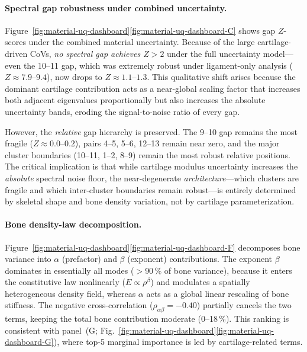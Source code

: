 \documentclass[11pt]{article}
\begin{document}
\paragraph{Spectral gap robustness under combined uncertainty.}
Figure~\ref{fig:material-uq-dashboard}\ref{fig:material-uq-dashboard-C} shows gap $Z$-scores under the combined material uncertainty.
Because of the large cartilage-driven CoVs, \emph{no spectral gap achieves $Z > 2$} under the full uncertainty model---even the 10--11 gap, which was extremely robust under ligament-only analysis ($Z \approx 7.9$--$9.4$), now drops to $Z \approx 1.1$--$1.3$.
This qualitative shift arises because the dominant cartilage contribution acts as a near-global scaling factor that increases both adjacent eigenvalues proportionally but also increases the absolute uncertainty bands, eroding the signal-to-noise ratio of every gap.

However, the \emph{relative} gap hierarchy is preserved.
The 9--10 gap remains the most fragile ($Z \approx 0.0$--$0.2$), pairs 4--5, 5--6, 12--13 remain near zero, and the major cluster boundaries (10--11, 1--2, 8--9) remain the most robust relative positions.
The critical implication is that while cartilage modulus uncertainty increases the \emph{absolute} spectral noise floor, the near-degenerate \emph{architecture}---which clusters are fragile and which inter-cluster boundaries remain robust---is entirely determined by skeletal shape and bone density variation, not by cartilage parameterization.

\paragraph{Bone density-law decomposition.}
Figure~\ref{fig:material-uq-dashboard}\ref{fig:material-uq-dashboard-F} decomposes bone variance into $\alpha$ (prefactor) and $\beta$ (exponent) contributions.
The exponent $\beta$ dominates in essentially all modes ($>$90\,\% of bone variance), because it enters the constitutive law nonlinearly ($E \propto \rho^{\beta}$) and modulates a spatially heterogeneous density field, whereas $\alpha$ acts as a global linear rescaling of bone stiffness.
The negative cross-correlation ($\rho_{\alpha\beta}=-0.40$) partially cancels the two terms, keeping the total bone contribution moderate (0--18\,\%).
This ranking is consistent with panel~(G; Fig.~\ref{fig:material-uq-dashboard}\ref{fig:material-uq-dashboard-G}), where top-5 marginal importance is led by cartilage-related terms.
\end{document}
